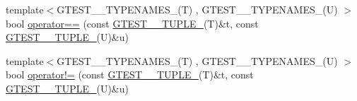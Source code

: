 \begin{DoxyCompactItemize}
\item 
{\footnotesize template$<$G\+T\+E\+S\+T\+\_\+\_\+\+T\+Y\+P\+E\+N\+A\+M\+E\+S\+\_\+(\+T) , G\+T\+E\+S\+T\+\_\+\_\+\+T\+Y\+P\+E\+N\+A\+M\+E\+S\+\_\+(\+U) $>$ }\\bool \hyperlink{namespacestd_1_1tr1_af4516de784404381f9b14797694b6311}{operator==} (const \hyperlink{namespacestd_1_1tr1_aa636d3269bf1f368a7bc09ff158bc482}{G\+T\+E\+S\+T\+\_\+\_\+\+T\+U\+P\+L\+E\+\_\+}(T)\&t, const \hyperlink{namespacestd_1_1tr1_aa636d3269bf1f368a7bc09ff158bc482}{G\+T\+E\+S\+T\+\_\+\_\+\+T\+U\+P\+L\+E\+\_\+}(U)\&u)
\item 
{\footnotesize template$<$G\+T\+E\+S\+T\+\_\+\_\+\+T\+Y\+P\+E\+N\+A\+M\+E\+S\+\_\+(\+T) , G\+T\+E\+S\+T\+\_\+\_\+\+T\+Y\+P\+E\+N\+A\+M\+E\+S\+\_\+(\+U) $>$ }\\bool \hyperlink{namespacestd_1_1tr1_a058882c51de469b5e78d29076f864940}{operator!=} (const \hyperlink{namespacestd_1_1tr1_aa636d3269bf1f368a7bc09ff158bc482}{G\+T\+E\+S\+T\+\_\+\_\+\+T\+U\+P\+L\+E\+\_\+}(T)\&t, const \hyperlink{namespacestd_1_1tr1_aa636d3269bf1f368a7bc09ff158bc482}{G\+T\+E\+S\+T\+\_\+\_\+\+T\+U\+P\+L\+E\+\_\+}(U)\&u)
\end{DoxyCompactItemize}
